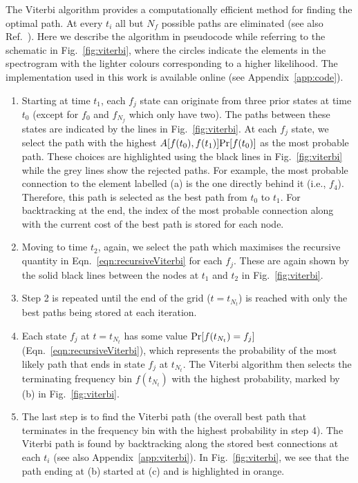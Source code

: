 \documentclass[paper-main.tex]{subfiles}
\begin{document}
The Viterbi algorithm provides a computationally efficient method for finding the optimal path. 
At every $t_i$ all but $N_f$ possible paths are eliminated (see also Ref.~\cite{ScoX1ViterbiO1:2017}). 
Here we describe the algorithm in pseudocode while referring to the schematic in Fig.~\ref{fig:viterbi}, where the circles indicate the elements in the spectrogram with the lighter colours corresponding to a higher likelihood. The implementation used in this work is available online (see Appendix~\ref{app:code}).
\begin{enumerate}
\item Starting at time $t_1$, each $f_j$ state can originate from three prior states at time $t_0$ (except for $f_0$ and $f_{N_f}$ which only have two). The paths between these states are indicated by the lines in Fig.~\ref{fig:viterbi}. At each $f_j$ state, we select the path with the highest $A[f(t_0),f(t_1)] {\rm Pr}[f(t_0)]$ as the most probable path. These choices are highlighted using the black lines in Fig.~\ref{fig:viterbi} while the grey lines show the rejected paths. For example, the most probable connection to the element labelled (a) is the one directly behind it (i.e., $f_4$). Therefore, this path is selected as the best path from $t_0$ to $t_1$. For backtracking at the end, the index of the most probable connection along with the current cost of the best path is stored for each node.

\item Moving to time $t_2$, again, we select the path which maximises the recursive quantity in Eqn.~\ref{eqn:recursiveViterbi} for each $f_j$. These are again shown by the solid black lines between the nodes at $t_1$ and $t_2$ in Fig.~\ref{fig:viterbi}.

\item Step 2 is repeated until the end of the grid ($t=t_{N_t}$) is reached with only the best paths being stored at each iteration. 

\item Each state $f_j$ at $t=t_{N_t}$ has some value ${\rm Pr}[f(t_{N_t})=f_j]$ (Eqn.~\ref{eqn:recursiveViterbi}), which represents the probability of the most likely path that ends in state $f_j$ at $t_{N_t}$. The Viterbi algorithm then selects the terminating frequency bin $f(t_{N_t})$ with the highest probability, marked by (b) in Fig.~\ref{fig:viterbi}.

\item The last step is to find the Viterbi path (the overall best path that terminates in the frequency bin with the highest probability in step 4). The Viterbi path is found by backtracking along the stored best connections at each $t_i$ (see also Appendix~\ref{app:viterbi}). In Fig.~\ref{fig:viterbi}, we see that the path ending at (b) started at (c) and is highlighted in orange.
\end{enumerate}
\end{document}
